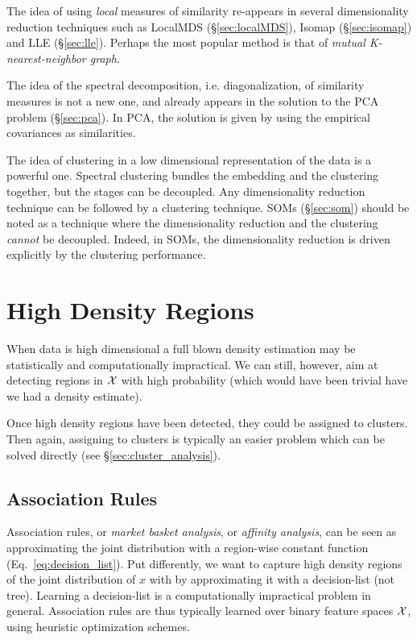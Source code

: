 The idea of using \emph{local} measures of similarity re-appears in several dimensionality reduction techniques such as LocalMDS (\S\ref{sec:localMDS}), Isomap (\S\ref{sec:isomap}) and LLE (\S\ref{sec:lle}).
Perhaps the most popular method is that of \emph{mutual K-nearest-neighbor graph}.

The idea of the spectral decomposition, i.e. diagonalization, of similarity measures is not a new one, and already appears in the solution to the PCA problem (\S\ref{sec:pca}). In PCA, the solution is given by using the empirical covariances as similarities. 

The idea of clustering in a low dimensional representation of the data is a powerful one. 
Spectral clustering bundles the embedding and the clustering together, but the stages can be decoupled. Any dimensionality reduction technique can be followed by a clustering technique.
SOMs (\S\ref{sec:som}) should be noted as a technique where the dimensionality reduction and the clustering \emph{cannot} be decoupled. Indeed, in SOMs, the dimensionality reduction is driven explicitly by the clustering performance.  







\section{High Density Regions}
\label{sec:high_density}

When data is high dimensional a full blown density estimation may be statistically and computationally impractical.
We can still, however, aim at detecting regions in $\mathcal{X}$ with high probability (which would have been trivial have we had a density estimate).

Once high density regions have been detected, they could be assigned to clusters. Then again, assigning to clusters is typically an easier problem which can be solved directly (see \S\ref{sec:cluster_analysis}).



\subsection{Association Rules}
\label{sec:association}
Association rules, or \emph{market basket analysis}, or \emph{affinity analysis}, can be seen as approximating the joint distribution with a region-wise constant function (Eq.~\ref{eq:decision_list}).
Put differently, we want to capture high density regions of the joint distribution of $x$ with by approximating it with a decision-list (not tree).
Learning a decision-list is a computationally impractical problem in general. Association rules are thus typically learned over binary feature spaces $\mathcal{X}$, using heuristic optimization schemes.

